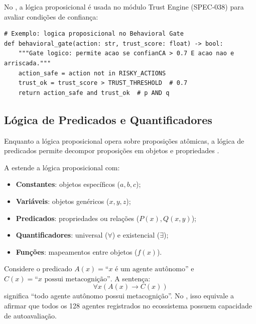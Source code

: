 \begin{exemplo}
    No \opencodeeco, a lógica proposicional é usada no módulo Trust Engine
    (SPEC-038) para avaliar condições de confiança:
    \begin{lstlisting}[style=pythonstyle]
# Exemplo: logica proposicional no Behavioral Gate
def behavioral_gate(action: str, trust_score: float) -> bool:
    """Gate logico: permite acao se confianCA > 0.7 E acao nao e arriscada."""
    action_safe = action not in RISKY_ACTIONS
    trust_ok = trust_score > TRUST_THRESHOLD  # 0.7
    return action_safe and trust_ok  # p AND q
    \end{lstlisting}
\end{exemplo}

\subsection{Lógica de Predicados e Quantificadores}

Enquanto a lógica proposicional opera sobre proposições atômicas, a lógica
de predicados permite decompor proposições em objetos e propriedades
\cite{russell2020inteligencia, wooldridge2009multiagent}.

\begin{definicao}
    A  estende a lógica proposicional com:
    \begin{itemize}
        \item \textbf{Constantes}: objetos específicos ($a, b, c$);
        \item \textbf{Variáveis}: objetos genéricos ($x, y, z$);
        \item \textbf{Predicados}: propriedades ou relações ($P(x), Q(x,y)$);
        \item \textbf{Quantificadores}: universal ($\forall$) e existencial
              ($\exists$);
        \item \textbf{Funções}: mapeamentos entre objetos ($f(x)$).
    \end{itemize}
\end{definicao}

\begin{exemplo}
    Considere o predicado $A(x) = \text{``}x\text{ é um agente autônomo''}$ e
    $C(x) = \text{``}x\text{ possui metacognição''}$. A sentença:
    \[
    \forall x (A(x) \to C(x))
    \]
    significa ``todo agente autônomo possui metacognição''. No \opencodeeco,
    isso equivale a afirmar que todos os 128 agentes registrados no
    ecossistema possuem capacidade de autoavaliação.
\end{exemplo}

